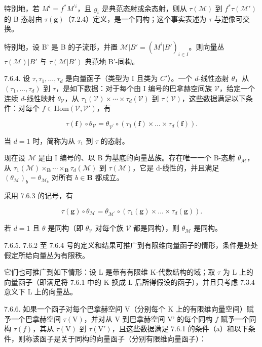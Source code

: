 特别地，若 \(M^{i}=f^{*}M^{'i}\)，且 \(g_{i}\) 是典范态射或余态射，则从 \(\tau(\mathcal{M})\) 到 \(f^{*}\tau(\mathcal{M}')\) 的 B-态射由 \(\tau(\mathbf{g})\)（7.2.4）定义，是一个同构；这个事实表述为 \(\tau\) 与逆像可交换。

特别地，设 B' 是 B 的子流形，并置 \(\mathcal{M}|B' = (M^{i}|B')_{i\in I}\)。则向量丛 \(\tau(\mathcal{M})|B'\) 与 \(\tau(\mathcal{M}|B')\) 典范地 B'-同构。

7.6.4. 设 \(\tau, \tau_1, \ldots, \tau_d\) 是向量函子（类型为 I 且类为 \(C'\)）。一个 \(d\)-线性态射 \(\theta\)，从 \((\tau_1, \ldots, \tau_d)\) 到 \(\tau\)，是如下数据：对于每个由 I 编号的巴拿赫空间族 \(\mathcal{V}\)，给定一个连续 \(d\)-线性映射 \(\theta_{\mathcal{V}}\)，从 \(\tau_1(\mathcal{V}) \times \cdots \times \tau_d(\mathcal{V})\) 到 \(\tau(\mathcal{V})\)，这些数据满足以下条件：对每个 \(f \in \text{Hom}(\mathcal{V}, \mathcal{V}')\)，有

\[
\tau (\mathbf {f}) \circ \theta_ {\mathcal{V}} = \theta_ {\mathcal{V}^{\prime}} \circ (\tau_ {1} (\mathbf {f}) \times \dots \times \tau _{d} (\mathbf {f})).
\]

当 \(d = 1\) 时，简称为从 \(\tau_1\) 到 \(\tau\) 的态射。

现在设 \(\mathcal{M}\) 是由 I 编号的、以 B 为基底的向量丛族。存在唯一一个 B-态射 \(\theta_{\mathcal{M}}\)，从 \(\tau_{1}(\mathcal{M}) \times_{\mathbf{B}} \cdots \times_{\mathbf{B}} \tau_{d}(\mathcal{M})\) 到 \(\tau(\mathcal{M})\)，它是 d-线性的，并且满足 \((\theta_{\mathcal{M}})_{b} = \theta_{\mathcal{M}_{b}}\) 对所有 \(b \in \mathbf{B}\) 都成立。

采用 7.6.3 的记号，有

\[
\tau (\mathbf {g}) \circ \theta_ {\mathcal {M}} = \theta_ {\mathcal {M} ^ {\prime}} \circ (\tau_ {1} (\mathbf {g}) \times \dots \times \tau_ {d} (\mathbf {g})).
\]

若 \(d=1\) 且 \(\theta\) 是同构（即 \(\theta_{\mathcal{V}}\) 对每个族 \(\mathcal{V}\) 都是同构），则 \(\theta_{\mathcal{M}}\) 是同构。

7.6.5. 7.6.2 至 7.6.4 号的定义和结果可推广到有限维向量函子的情形，条件是处处假定所给向量丛为有限秩。

它们也可推广到如下情形：设 L 是带有有限维 K-代数结构的域；取 \(\tau\) 为 L 上的向量函子（即满足将 7.6.1 中的 K 换成 L 后所得假设的函子），并且只考虑 7.3.4 意义下 L 上的向量丛。

7.6.6. 如果一个函子对每个巴拿赫空间 V（分别每个 K 上的有限维向量空间）赋予一个巴拿赫空间 \(\tau(\mathrm{V})\)，并对从 V 到巴拿赫空间 V' 的每个同构 \(f\) 赋予一个同构 \(\tau(f)\)，其从 \(\tau(\mathrm{V})\) 到 \(\tau(\mathrm{V}')\)，且这些数据满足 7.6.1 的条件（a）和以下条件，则称该函子是关于同构的向量函子（分别有限维向量函子）：

